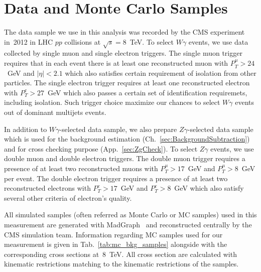 \section{Data and Monte Carlo Samples}
\label{sec:DataAndMC}

The data sample we use in this analysis was recorded by the CMS experiment in~2012 in LHC $pp$ collisions at $\sqrt{s}=8$~TeV. To select $W\gamma$ events, we use data collected by single muon and single electron triggers. The single muon trigger requires that in each event there is at least one reconstructed muon with $P_T^{\mu}>24$~GeV and $|\eta|<2.1$ which also satisfies certain requirement of isolation from other particles. The single electron trigger requires at least one reconstructed electron with $P_T^{e}>27$~GeV which also passes a certain set of identification requiremets, including isolation. Such trigger choice maximize our chances to select $W\gamma$ events out of dominant multijets events.

In addition to $W\gamma$-selected data sample, we also prepare $Z\gamma$-selected data sample which is used for the background estimation (Ch.~\ref{sec:BackgroundSubtraction}) and for cross checking purpose (App.~\ref{sec:ZgCheck}). To select $Z\gamma$ events, we use double muon and double electron triggers. The double muon trigger requires a presence of at least two reconstructed muons with $P_T^{\mu}>17$~GeV and $P_T^{\mu}>8$~GeV per event. The double electron trigger requires a presence of at least two reconstructed electrons with $P_T^{e}>17$~GeV and $P_T^{e}>8$~GeV which also satisfy several other criteria of electron's quality.





All simulated samples (often referred as Monte Carlo or MC samples) used in this measurement are generated with MadGraph~\cite{ref_MadGraph} and reconstructed centrally by the CMS simulation team. Information regarding MC samples used for our measurement is given in Tab.~\ref{tab:mc_bkg_samples} alongside with the corresponding cross sections at~$8$~TeV. All cross section are calculated with kinematic restrictions matching to the kinematic restrictions of the samples. 

